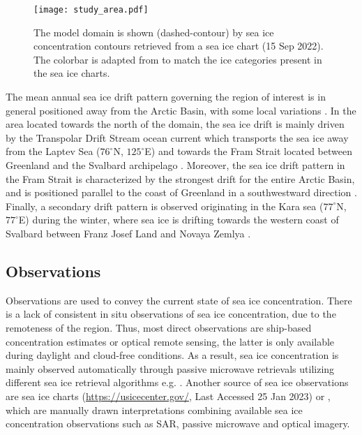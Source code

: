 \documentclass[../main/thesis.tex]{subfiles}
\begin{document}
\begin{figure}
    \centering
    \texttt{[image: study\_area.pdf]}
    \caption{\label{fig:studyarea}The model domain is shown (dashed-contour) by sea ice concentration contours retrieved from a sea ice chart (15 Sep 2022). The colorbar is adapted from \protect\citet{WMO2014} to match the ice categories present in the sea ice charts.}
\end{figure}

The mean annual sea ice drift pattern governing the region of interest is in general positioned away from the Arctic Basin, with some local variations \citep{Barry1993}. In the area located towards the north of the domain, the sea ice drift is mainly driven by the Transpolar Drift Stream ocean current which transports the sea ice away from the Laptev Sea ($76^\circ$N, $125^\circ$E) and towards the Fram Strait located between Greenland and the Svalbard archipelago \citep{Colony1984}. Moreover, the sea ice drift pattern in the Fram Strait is characterized by the strongest drift for the entire Arctic Basin, and is positioned parallel to the coast of Greenland in a southwestward direction \citep{Barry1993}. Finally, a secondary drift pattern is observed originating in the Kara sea ($77^\circ$N, $77^\circ$E) during the winter, where sea ice is drifting towards the western coast of Svalbard between Franz Josef Land and Novaya Zemlya \citep{Kaur2018}.

\subsection{Observations}
Observations are used to convey the current state of sea ice concentration. There is a lack of consistent in situ observations of sea ice concentration, due to the remoteness of the region. Thus, most direct observations are ship-based concentration estimates \citep{Kern2019} or optical remote sensing, the latter is only available during daylight and cloud-free conditions. As a result, sea ice concentration is mainly observed automatically through passive microwave retrievals utilizing different sea ice retrieval algorithms e.g. \citep{Comiso1997,Spreen2008, Lavergne2019a}. Another source of sea ice observations are sea ice charts (\url{https://usicecenter.gov/}, Last Accessed 25 Jan 2023) or \citep{Dinessen2020}, which are manually drawn interpretations combining available sea ice concentration observations such as SAR, passive microwave and optical imagery. 
\end{document}

